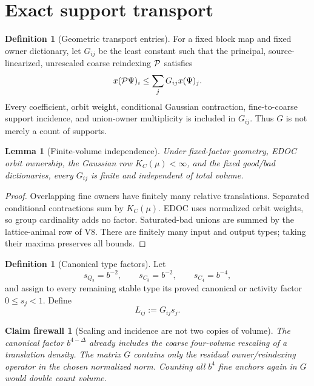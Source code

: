 \documentclass[11pt,oneside]{book}
\newtheorem{lemma}[theorem]{Lemma}
\newtheorem{firewall}[theorem]{Claim firewall}
\theoremstyle{definition}
\newtheorem{definition}[theorem]{Definition}
\theoremstyle{remark}
\begin{document}
\section{Exact support transport}
\label{sec:e8v11-transport}

\begin{definition}[Geometric transport entries]
\label{def:e8v11-G}
For a fixed block map and fixed owner dictionary, let \(G_{ij}\) be
the least constant such that the principal, source-linearized,
unrescaled coarse reindexing \({\cal P}\) satisfies
\[
 x({\cal P}\Psi)_i\le\sum_jG_{ij}x(\Psi)_j.          \label{eq:e8v11-G-bound}
\]
Every coefficient, orbit weight, conditional Gaussian contraction,
fine-to-coarse support incidence, and union-owner multiplicity is
included in \(G_{ij}\).  Thus \(G\) is not merely a count of supports.
\end{definition}

\begin{lemma}[Finite-volume independence]
\label{lem:e8v11-G-finite}
Under fixed-factor geometry, EDOC orbit ownership, the Gaussian row
\(K_C(\mu)<\infty\), and the fixed good/bad dictionaries, every
\(G_{ij}\) is finite and independent of total volume.
\end{lemma}

\begin{proof}
Overlapping fine owners have finitely many relative translations.
Separated conditional contractions sum by \(K_C(\mu)\).  EDOC uses
normalized orbit weights, so group cardinality adds no factor.
Saturated-bad unions are summed by the lattice-animal row of V8.
There are finitely many input and output types; taking their maxima
preserves all bounds.
\end{proof}

\begin{definition}[Canonical type factors]
\label{def:e8v11-s}
Let
\[
 s_{Q_2}=b^{-2},\qquad s_{C_3}=b^{-2},\qquad
 s_{C_4}=b^{-4},                                    \label{eq:e8v11-core-factors}
\]
and assign to every remaining stable type its proved canonical or
activity factor \(0\le s_j<1\).  Define
\[
 L_{ij}:=G_{ij}s_j.                                 \label{eq:e8v11-L}
\]
\end{definition}

\begin{firewall}[Scaling and incidence are not two copies of volume]
\label{fire:e8v11-volume}
The canonical factor \(b^{4-\Delta}\) already includes the coarse
four-volume rescaling of a translation density.  The matrix \(G\)
contains only the residual owner/reindexing operator in the chosen
normalized norm.  Counting all \(b^4\) fine anchors again in \(G\)
would double count volume.
\end{firewall}
\end{document}
